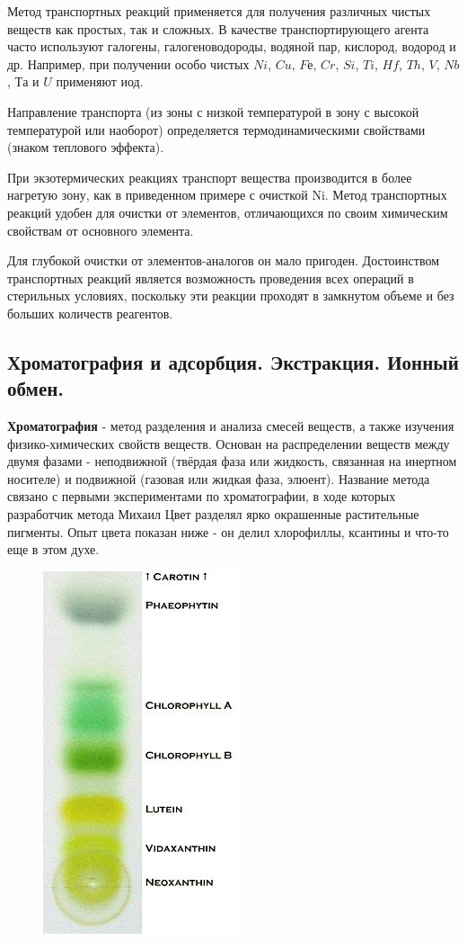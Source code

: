 \documentclass[14pt,a4paper]{scrartcl}
\begin{document}
Метод транспортных реакций применяется для получения различных чистых веществ как простых, так и сложных. В качестве транспортирующего агента часто используют галогены, галогеноводороды, водяной пар, кислород, водород и др. Например, при получении особо чистых $Ni$, $Cu$, $Fе$, $Cr$, $Si$, $Ti$, $Hf$, $Th$, $V$, $Nb$, $Та$ и $U$ применяют иод.

Направление транспорта (из зоны с низкой температурой в зону с высокой температурой или наоборот) определяется термодинамическими свойствами (знаком теплового эффекта).

При экзотермических реакциях транспорт вещества производится в более нагретую зону, как в приведенном примере с очисткой Ni. Метод транспортных реакций удобен для очистки от элементов, отличающихся по своим химическим свойствам от основного элемента.

Для глубокой очистки от элементов-аналогов он мало пригоден. Достоинством транспортных реакций является возможность проведения всех операций в стерильных условиях, поскольку эти реакции проходят в замкнутом объеме и без больших количеств реагентов.

\subsection*{Хроматография и адсорбция. Экстракция. Ионный обмен.} 
\textbf{Хроматография} -  метод разделения и анализа смесей веществ, а также изучения физико-химических свойств веществ. Основан на распределении веществ между двумя фазами - неподвижной (твёрдая фаза или жидкость, связанная на инертном носителе) и подвижной (газовая или жидкая фаза, элюент). Название метода связано с первыми экспериментами по хроматографии, в ходе которых разработчик метода Михаил Цвет разделял ярко окрашенные растительные пигменты. Опыт цвета показан ниже - он делил хлорофиллы, ксантины и что-то еще в этом духе.

\begin{figure}[htp]
\centering
\includegraphics[scale=.5]{chromatorgamm.jpg}
\caption{}
\label{}
\end{figure}
\end{document}

